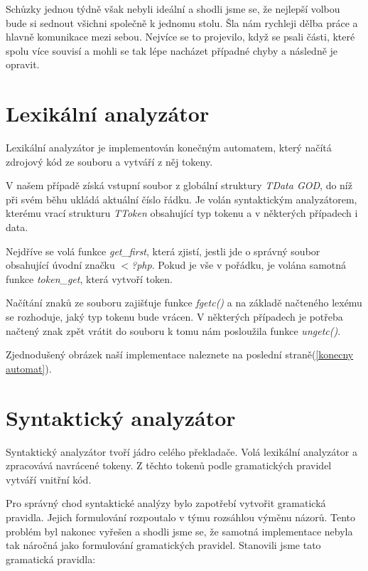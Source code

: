 \documentclass[12pt,a4paper,titlepage,final]{article}
\begin{document}
Schůzky jednou týdně však nebyli ideální a shodli jsme se, že nejlepší volbou bude si sednout všichni společně k jednomu stolu. Šla nám rychleji dělba práce a hlavně komunikace mezi sebou. Nejvíce se to projevilo, když se psali části, které spolu více souvisí a mohli se tak lépe nacházet případné chyby a následně je opravit.


\section{Lexikální analyzátor} \label{lexika}

Lexikální analyzátor je implementován konečným automatem, který načítá zdrojový kód ze souboru a
vytváří z něj tokeny. 

V našem případě získá vstupní soubor z globální struktury \textit{TData GOD},  
do níž při svém běhu ukládá aktuální číslo řádku. Je volán syntaktickým analyzátorem, 
kterému vrací strukturu \textit{TToken} obsahující typ tokenu a v některých případech i data.

Nejdříve se volá funkce \textit{get\_first}, která zjistí, jestli jde o správný soubor obsahující 
úvodní značku \textit{$<$?php}. Pokud je vše v pořádku, je volána samotná funkce \textit{token\_get}, 
která vytvoří token.  

Načítání znaků ze souboru zajišťuje funkce \textit{fgetc()} a na základě načteného lexému se rozhoduje,
jaký typ tokenu bude vrácen. V některých případech je potřeba načtený znak zpět vrátit do souboru k tomu 
nám posloužila funkce \textit{ungetc()}.

Zjednodušený obrázek naší implementace naleznete na poslední straně(\ref{konecny automat}).

\section{Syntaktický analyzátor} \label{syntaktika}

Syntaktický analyzátor tvoří jádro celého překladače. Volá lexikální analyzátor a zpracovává navrácené tokeny. 
Z těchto tokenů podle gramatických pravidel vytváří vnitřní kód.

Pro správný chod syntaktické analýzy bylo zapotřebí vytvořit gramatická pravidla. Jejich formulování rozpoutalo
v týmu rozsáhlou výměnu názorů. Tento problém byl nakonec vyřešen a shodli jsme se, že samotná implementace nebyla
tak náročná jako formulování gramatických pravidel. Stanovili jsme tato  gramatická pravidla:\\
\end{document}
